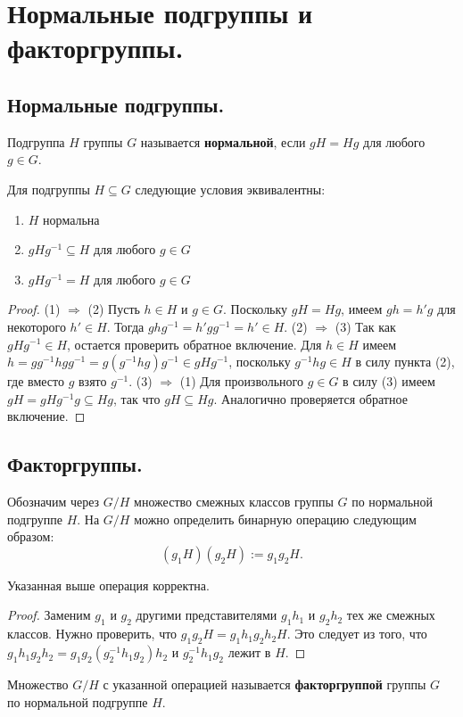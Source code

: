 \section{Нормальные подгруппы и факторгруппы.}

\subsection{Нормальные подгруппы.}
\begin{definition}
    Подгруппа $H$ группы $G$ называется \textbf{нормальной}, если $gH = Hg$ для любого $g \in G$.
\end{definition}
\begin{statement}
    Для подгруппы $H \subseteq G$ следующие условия эквивалентны:
    \begin{enumerate}
        \item $H$ нормальна
        \item $gHg^{-1} \subseteq H$ для любого $g \in G$
        \item $gHg^{-1} = H$ для любого $g \in G$
    \end{enumerate}
    \begin{proof}
        (1) $\Rightarrow$ (2) Пусть $h \in H$ и $g \in G$. Поскольку $gH = Hg$, имеем $gh = h'g$ для некоторого $h' \in H$. Тогда $ghg^{-1} = h'gg^{-1} = h' \in H$.
        \newline
        (2) $\Rightarrow$ (3) Так как $gHg^{-1} \in H$, остается проверить обратное включение. Для $h \in H$ имеем $h = gg^{-1}hgg^{-1} = g(g^{-1}hg)g^{-1} \in gHg^{-1}$, поскольку $g^{-1}hg \in H$ в силу пункта (2), где вместо $g$ взято $g^{-1}$.
        \newline
        (3) $\Rightarrow$ (1) Для произвольного $g \in G$ в силу (3) имеем $gH = gHg^{-1}g \subseteq Hg$, так что $gH \subseteq Hg$. Аналогично проверяется обратное включение.
        \newline
    \end{proof}
\end{statement}

\subsection{Факторгруппы.}
Обозначим через $G / H$ множество смежных классов группы $G$ по нормальной подгруппе $H$. На $G / H$ можно определить бинарную операцию следующим образом:
\[
    (g_1H)(g_2H) := g_1g_2H.
\]
\begin{statement}
    Указанная выше операция корректна.
    \begin{proof}
        Заменим $g_1$ и $g_2$ другими представителями $g_1h_1$ и $g_2h_2$ тех же смежных классов. Нужно проверить, что $g_1g_2H = g_1h_1g_2h_2H$. Это следует из того, что $g_1h_1g_2h_2 = g_1g_2(g_2^{-1}h_1g_2)h_2$ и $g_2^{-1}h_1g_2$ лежит в $H$.
    \end{proof}
\end{statement}
\begin{definition}
    Множество $G / H$ с указанной операцией называется \textbf{факторгруппой} группы $G$ по нормальной подгруппе $H$.
\end{definition}
